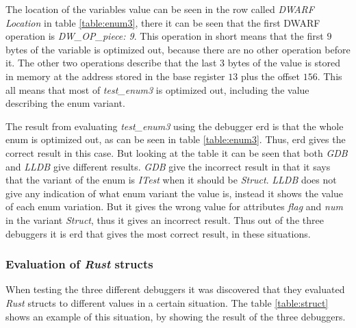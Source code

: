 The location of the variables value can be seen in the row called \emph{DWARF Location} in table \ref{table:enum3}, there it can be seen that the first \gls{DWARF} operation is \emph{DW\_OP\_piece: 9}.
This operation in short means that the first $9$ bytes of the variable is optimized out, because there are no other operation before it.
The other two operations describe that the last $3$ bytes of the value is stored in memory at the address stored in the base register $13$ plus the offset $156$.
This all means that most of \emph{test\_enum3} is optimized out, including the value describing the enum variant.


The result from evaluating \emph{test\_enum3} using the debugger \gls{erd} is that the whole enum is optimized out, as can be seen in table \ref{table:enum3}.
Thus, \gls{erd} gives the correct result in this case.
But looking at the table it can be seen that both \emph{GDB} and \emph{LLDB} give different results.
\emph{GDB} give the incorrect result in that it says that the variant of the enum is \emph{ITest} when it should be \emph{Struct}.
\emph{LLDB} does not give any indication of what enum variant the value is, instead it shows the value of each enum variation.
But it gives the wrong value for attributes \emph{flag} and \emph{num} in the variant \emph{Struct}, thus it gives an incorrect result.
Thus out of the three debuggers it is \gls{erd} that gives the most correct result, in these situations.



\subsubsection{Evaluation of \emph{Rust} structs}
When testing the three different debuggers it was discovered that they evaluated \emph{Rust} structs to different values in a certain situation.
The table \ref{table:struct} shows an example of this situation, by showing the result of the three debuggers.


